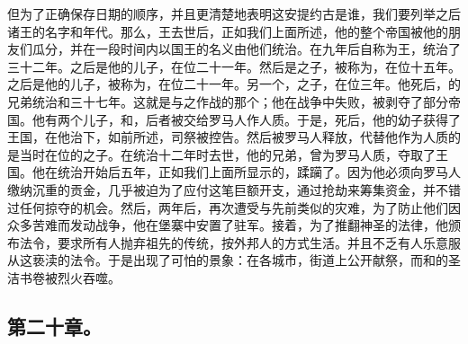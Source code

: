 但为了正确保存日期的顺序，并且更清楚地表明这安提约古是谁，我们要列举之后诸王的名字和年代。那么，王去世后，正如我们上面所述，他的整个帝国被他的朋友们瓜分，并在一段时间内以国王的名义由他们统治。在九年后自称为王，统治了三十二年。之后是他的儿子，在位二十一年。然后是之子，被称为，在位十五年。之后是他的儿子，被称为，在位二十一年。另一个，之子，在位三年。他死后，的兄弟统治和三十七年。这就是与之作战的那个；他在战争中失败，被剥夺了部分帝国。他有两个儿子，和，后者被交给罗马人作人质。于是，死后，他的幼子获得了王国，在他治下，如前所述，司祭被控告。然后被罗马人释放，代替他作为人质的是当时在位的之子。在统治十二年时去世，他的兄弟，曾为罗马人质，夺取了王国。他在统治开始后五年，正如我们上面所显示的，蹂躏了。因为他必须向罗马人缴纳沉重的贡金，几乎被迫为了应付这笔巨额开支，通过抢劫来筹集资金，并不错过任何掠夺的机会。然后，两年后，再次遭受与先前类似的灾难，为了防止他们因众多苦难而发动战争，他在堡寨中安置了驻军。接着，为了推翻神圣的法律，他颁布法令，要求所有人抛弃祖先的传统，按外邦人的方式生活。并且不乏有人乐意服从这亵渎的法令。于是出现了可怕的景象：在各城市，街道上公开献祭，而和的圣洁书卷被烈火吞噬。\par


\subsection{第二十章。}

